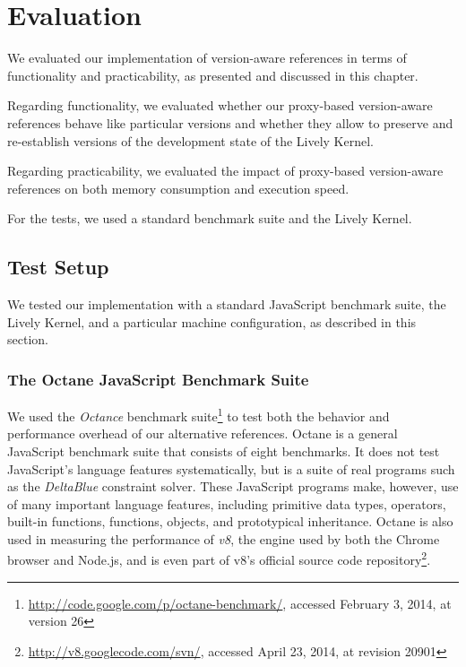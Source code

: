 \chapter{Evaluation} \label{chapter:EVALUATION}

We evaluated our implementation of version-aware references in terms of functionality and practicability, as presented and discussed in this chapter.

Regarding functionality, we evaluated whether our proxy-based version-aware references behave like particular versions and whether they allow to preserve and re-establish versions of the development state of the Lively Kernel.

Regarding practicability, we evaluated the impact of proxy-based version-aware references on both memory consumption and execution speed.

For the tests, we used a standard benchmark suite and the Lively Kernel.


\section{Test Setup}

We tested our implementation with a standard JavaScript benchmark suite, the Lively Kernel, and a particular machine configuration, as described in this section.

\subsection{The Octane JavaScript Benchmark Suite}

We used the \emph{Octance} benchmark suite\footnote{\url{http://code.google.com/p/octane-benchmark/}, accessed February 3, 2014, at version 26} to test both the behavior and performance overhead of our alternative references.
Octane is a general JavaScript benchmark suite that consists of eight benchmarks.
It does not test JavaScript's language features systematically, but is a suite of real programs such as the \emph{DeltaBlue}\cite{FreemanBenson1990ICS} constraint solver.
These JavaScript programs make, however, use of many important language features, including primitive data types, operators, built-in functions, functions, objects, and prototypical inheritance.
Octane is also used in measuring the performance of \emph{v8}, the engine used by both the Chrome browser and Node.js, and is even part of v8's official source code repository\footnote{\url{http://v8.googlecode.com/svn/}, accessed April 23, 2014, at revision 20901}.


